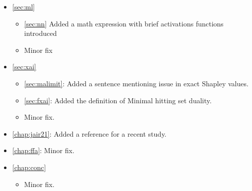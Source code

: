 \begin{itemize}
	\item \autoref{sec:ml}
		\begin{itemize}
			\item \autoref{sec:nn} Added a math expression with brief activations
				functions introduced
			\item Minor fix
		\end{itemize}
	\item \autoref{sec:xai}
		\begin{itemize}
			\item \autoref{sec:malimit}: Added a sentence mentioning issue in exact
				Shapley values.
			\item \autoref{sec:fxai}: Added the definition of Minimal hitting set
				duality.
			\item Minor fix.
		\end{itemize}
	\item \autoref{chap:jair21}: Added a reference for a recent study.
	\item \autoref{chap:ffa}: Minor fix.
	\item \autoref{chap:conc}
		\begin{itemize}
			\item Minor fix.
		\end{itemize}
	
\end{itemize}
\color{black}
